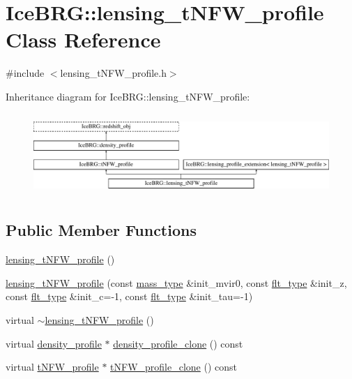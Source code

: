 \hypertarget{classIceBRG_1_1lensing__tNFW__profile}{\section{Ice\-B\-R\-G\-:\-:lensing\-\_\-t\-N\-F\-W\-\_\-profile Class Reference}
\label{classIceBRG_1_1lensing__tNFW__profile}
}


{\ttfamily \#include $<$lensing\-\_\-t\-N\-F\-W\-\_\-profile.\-h$>$}

Inheritance diagram for Ice\-B\-R\-G\-:\-:lensing\-\_\-t\-N\-F\-W\-\_\-profile\-:\begin{figure}[H]
\begin{center}
\leavevmode
\includegraphics[height=3.146068cm]{classIceBRG_1_1lensing__tNFW__profile}
\end{center}
\end{figure}
\subsection*{Public Member Functions}
\begin{DoxyCompactItemize}
\item 
\hyperlink{classIceBRG_1_1lensing__tNFW__profile_a5fe1c91ba555af2dce8af625e544331b}{lensing\-\_\-t\-N\-F\-W\-\_\-profile} ()
\item 
\hyperlink{classIceBRG_1_1lensing__tNFW__profile_a65bbc405f339adc927f41b778ca3bcc8}{lensing\-\_\-t\-N\-F\-W\-\_\-profile} (const \hyperlink{namespaceIceBRG_a1be72ac4918a9b029f2eefa084213e35}{mass\-\_\-type} \&init\-\_\-mvir0, const \hyperlink{lib_2IceBRG__main_2common_8h_ad0f130a56eeb944d9ef2692ee881ecc4}{flt\-\_\-type} \&init\-\_\-z, const \hyperlink{lib_2IceBRG__main_2common_8h_ad0f130a56eeb944d9ef2692ee881ecc4}{flt\-\_\-type} \&init\-\_\-c=-\/1, const \hyperlink{lib_2IceBRG__main_2common_8h_ad0f130a56eeb944d9ef2692ee881ecc4}{flt\-\_\-type} \&init\-\_\-tau=-\/1)
\item 
virtual \hyperlink{classIceBRG_1_1lensing__tNFW__profile_ab80da109e4628eb0b1d0915b241cb668}{$\sim$lensing\-\_\-t\-N\-F\-W\-\_\-profile} ()
\item 
virtual \hyperlink{classIceBRG_1_1density__profile}{density\-\_\-profile} $\ast$ \hyperlink{classIceBRG_1_1lensing__tNFW__profile_af196f26f5ed61c128e2931157676eb3a}{density\-\_\-profile\-\_\-clone} () const 
\item 
virtual \hyperlink{classIceBRG_1_1tNFW__profile}{t\-N\-F\-W\-\_\-profile} $\ast$ \hyperlink{classIceBRG_1_1lensing__tNFW__profile_a6954e2ab7524e90a2b1f61b7387982d7}{t\-N\-F\-W\-\_\-profile\-\_\-clone} () const 
\end{DoxyCompactItemize}
